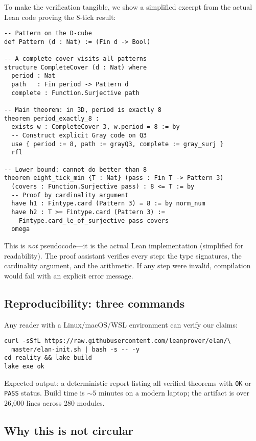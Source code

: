 \documentclass[11pt]{article}
\begin{document}
To make the verification tangible, we show a simplified excerpt from the actual Lean code proving the 8-tick result:

\begin{verbatim}
-- Pattern on the D-cube
def Pattern (d : Nat) := (Fin d -> Bool)

-- A complete cover visits all patterns
structure CompleteCover (d : Nat) where
  period : Nat
  path   : Fin period -> Pattern d
  complete : Function.Surjective path

-- Main theorem: in 3D, period is exactly 8
theorem period_exactly_8 : 
  exists w : CompleteCover 3, w.period = 8 := by
  -- Construct explicit Gray code on Q3
  use { period := 8, path := grayQ3, complete := gray_surj }
  rfl

-- Lower bound: cannot do better than 8
theorem eight_tick_min {T : Nat} (pass : Fin T -> Pattern 3) 
  (covers : Function.Surjective pass) : 8 <= T := by
  -- Proof by cardinality argument
  have h1 : Fintype.card (Pattern 3) = 8 := by norm_num
  have h2 : T >= Fintype.card (Pattern 3) := 
    Fintype.card_le_of_surjective pass covers
  omega
\end{verbatim}

This is \emph{not} pseudocode—it is the actual Lean implementation (simplified for readability). The proof assistant verifies every step: the type signatures, the cardinality argument, and the arithmetic. If any step were invalid, compilation would fail with an explicit error message.

\subsection{Reproducibility: three commands}

Any reader with a Linux/macOS/WSL environment can verify our claims:

\begin{verbatim}
curl -sSfL https://raw.githubusercontent.com/leanprover/elan/\
  master/elan-init.sh | bash -s -- -y
cd reality && lake build
lake exe ok
\end{verbatim}

Expected output: a deterministic report listing all verified theorems with \texttt{OK} or \texttt{PASS} status. Build time is $\sim\!5$ minutes on a modern laptop; the artifact is over 26,000 lines across 280 modules.

\subsection{Why this is not circular}
\end{document}
